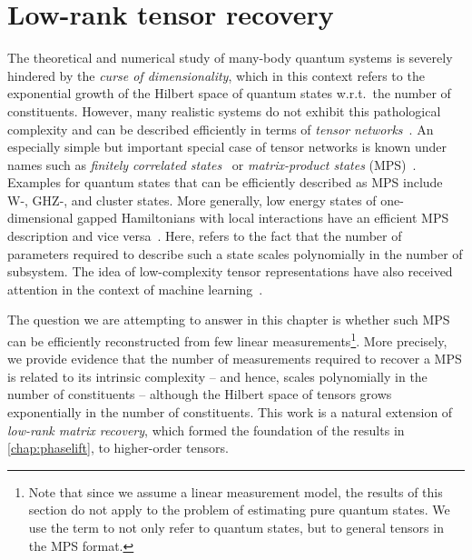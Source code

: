 
\chapter{Low-rank tensor recovery}%
\label{chap:tensors}


The theoretical and numerical study of many-body quantum systems is severely hindered by the \emph{curse of dimensionality}, which in this context refers to the exponential growth of the Hilbert space of quantum states w.r.t.\ the number of constituents.
However, many realistic systems do not exhibit this pathological complexity and can be described efficiently in terms of \emph{tensor networks}~\cite{}.
An especially simple but important special case of tensor networks is known under names such as \emph{finitely correlated states}~\cite{Fannes_1992_Finitely} or \emph{matrix-product states} (MPS)~\cite{Garcia_2006_Matrix,Verstraete_2008_Matrix,Orus_2014_Practical}.
Examples for quantum states that can be efficiently described as MPS include W-, GHZ-, and cluster states.
More generally, low energy states of one-dimensional gapped Hamiltonians with local interactions have an efficient MPS description and vice versa~\cite{}.
Here,  refers to the fact that the number of parameters required to describe such a state scales polynomially in the number of subsystem.
The idea of low-complexity tensor representations have also received attention in the context of machine learning~\cite{Novikov_2015_Tensorizing,Tai_2015_Convolutional,Yang_2016_Deep,Stoudenmire_2016_Supervised,Chen_2017_Parallelized,Bengua}.

The question we are attempting to answer in this chapter is whether such MPS can be efficiently reconstructed from few linear measurements\footnote{%
  Note that since we assume a linear measurement model, the results of this section do not apply to the problem of estimating pure quantum states.
  We use the term  to not only refer to quantum states, but to general tensors in the MPS format.
}.
More precisely, we provide evidence that the number of measurements required to recover a MPS is related to its intrinsic complexity -- and hence, scales polynomially in the number of constituents -- although the Hilbert space of tensors grows exponentially in the number of constituents.
This work is a natural extension of \emph{low-rank matrix recovery}, which formed the foundation of the results in \cref{chap:phaselift}, to higher-order tensors.\\



